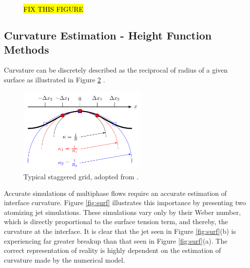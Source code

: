 \begin{figure}[htbp]
		\caption{\hl{FIX THIS FIGURE}}
	\label{fig:rudmesh}
\end{figure}

\subsection{Curvature Estimation - Height Function Methods}

Curvature can be discretely described as the reciprocal of radius of a given surface as illustrated in Figure \ref{fig:curv} \cite{MARK2013}. 

 \begin{figure}[htbp]
	\centering
	\includegraphics[width=2.5in]{figs/curv}
	\caption{Typical staggered grid, adopted from \cite{TRYG}.}
	\label{fig:curv}
\end{figure}

\noindent {}Accurate simulations of multiphase flows require an accurate estimation of interface curvature. Figure \ref{fig:surf} illustrates this importance by presenting two atomizing jet simulations. These simulations vary only by their Weber number, which is directly proportional to the surface tension term, and thereby, the curvature at the interface. It is clear that the jet seen in Figure \ref{fig:surf}(b) is experiencing far greater breakup than that seen in Figure \ref{fig:surf}(a). The correct representation of reality is highly dependent on the estimation of curvature made by the numerical model. 

